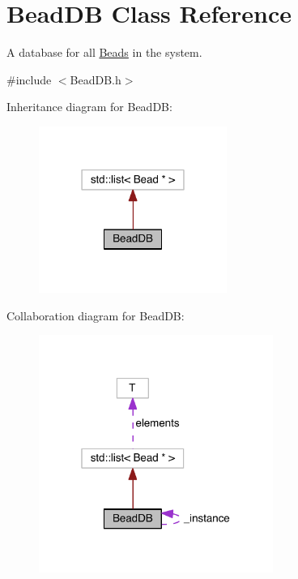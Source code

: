 \hypertarget{classBeadDB}{\section{Bead\+D\+B Class Reference}
\label{classBeadDB}
}


A database for all \hyperlink{classBead}{Beads} in the system.  




{\ttfamily \#include $<$Bead\+D\+B.\+h$>$}



Inheritance diagram for Bead\+D\+B\+:\nopagebreak
\begin{figure}[H]
\begin{center}
\leavevmode
\includegraphics[width=174pt]{classBeadDB__inherit__graph}
\end{center}
\end{figure}


Collaboration diagram for Bead\+D\+B\+:\nopagebreak
\begin{figure}[H]
\begin{center}
\leavevmode
\includegraphics[width=217pt]{classBeadDB__coll__graph}
\end{center}
\end{figure}
